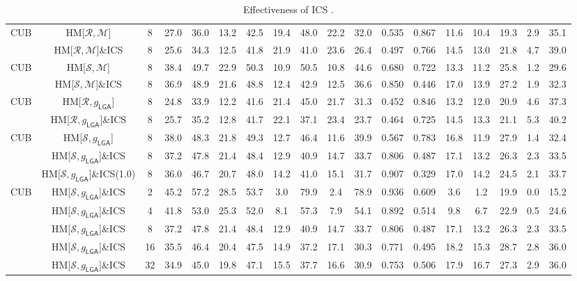 \begin{table*}
{\begin{tabular}{c|cc|cccc|ccccc|ccccc|c}
\multirow{2}{*}{CUB} & HM{[}$\mathcal{R},\mathcal{M}${]} & 8 & 27.0 & 36.0 & 13.2 & 42.5 & 19.4 & 48.0 & 22.2 & 32.0 & 0.535 & 0.867 & 11.6 & 10.4 & 19.3 & 2.9 & 35.1\tabularnewline
 & HM{[}$\mathcal{R},\mathcal{M}${]}\&ICS & 8 & 25.6 & 34.3 & 12.5 & 41.8 & 21.9 & 41.0 & 23.6 & 26.4 & 0.497 & 0.766 & 14.5 & 13.0 & 21.8 & 4.7 & 39.0\tabularnewline
\hline 
\multirow{2}{*}{CUB} & HM{[}$\mathcal{S},\mathcal{M}${]} & 8 & 38.4 & 49.7 & 22.9 & 50.3 & 10.9 & 50.5 & 10.8 & 44.6 & 0.680 & 0.722 & 13.3 & 11.2 & 25.8 & 1.2 & 29.6\tabularnewline
 & HM{[}$\mathcal{S},\mathcal{M}${]}\&ICS & 8 & 36.9 & 48.9 & 21.6 & 48.8 & 12.4 & 42.9 & 12.5 & 36.6 & 0.850 & 0.446 & 17.0 & 13.9 & 27.2 & 1.9 & 32.3\tabularnewline
\hline 
\multirow{2}{*}{CUB} & HM{[}$\mathcal{R},g_{\mathsf{LGA}}${]} & 8 & 24.8 & 33.9 & 12.2 & 41.6 & 21.4 & 45.0 & 21.7 & 31.3 & 0.452 & 0.846 & 13.2 & 12.0 & 20.9 & 4.6 & 37.3\tabularnewline
 & HM{[}$\mathcal{R},g_{\mathsf{LGA}}${]}\&ICS & 8 & 25.7 & 35.2 & 12.8 & 41.7 & 22.1 & 37.1 & 23.4 & 23.7 & 0.464 & 0.725 & 14.5 & 13.3 & 21.1 & 5.3 & 40.2\tabularnewline
\hline 
\multirow{3}{*}{CUB} & HM{[}$\mathcal{S},g_{\mathsf{LGA}}${]} & 8 & 38.0 & 48.3 & 21.8 & 49.3 & 12.7 & 46.4 & 11.6 & 39.9 & 0.567 & 0.783 & 16.8 & 11.9 & 27.9 & 1.4 & 32.4\tabularnewline
 & HM{[}$\mathcal{S},g_{\mathsf{LGA}}${]}\&ICS & 8 & 37.2 & 47.8 & 21.4 & 48.4 & 12.9 & 40.9 & 14.7 & 33.7 & 0.806 & 0.487 & 17.1 & 13.2 & 26.3 & 2.3 & 33.5\tabularnewline
 & HM{[}$\mathcal{S},g_{\mathsf{LGA}}${]}\&ICS(1.0) & 8 & 36.0 & 46.7 & 20.7 & 48.0 & 14.2 & 41.0 & 15.1 & 31.7 & 0.907 & 0.329 & 17.0 & 14.2 & 24.5 & 2.1 & 33.7\tabularnewline
\hline 
\multirow{5}{*}{CUB} & HM{[}$\mathcal{S},g_{\mathsf{LGA}}${]}\&ICS & 2 & 45.2 & 57.2 & 28.5 & 53.7 & 3.0 & 79.9 & 2.4 & 78.9 & 0.936 & 0.609 & 3.6 & 1.2 & 19.9 & 0.0 & 15.2\tabularnewline
 & HM{[}$\mathcal{S},g_{\mathsf{LGA}}${]}\&ICS & 4 & 41.8 & 53.0 & 25.3 & 52.0 & 8.1 & 57.3 & 7.9 & 54.1 & 0.892 & 0.514 & 9.8 & 6.7 & 22.9 & 0.5 & 24.6\tabularnewline
 & HM{[}$\mathcal{S},g_{\mathsf{LGA}}${]}\&ICS & 8 & 37.2 & 47.8 & 21.4 & 48.4 & 12.9 & 40.9 & 14.7 & 33.7 & 0.806 & 0.487 & 17.1 & 13.2 & 26.3 & 2.3 & 33.5\tabularnewline
 & HM{[}$\mathcal{S},g_{\mathsf{LGA}}${]}\&ICS & 16 & 35.5 & 46.4 & 20.4 & 47.5 & 14.9 & 37.2 & 17.1 & 30.3 & 0.771 & 0.495 & 18.2 & 15.3 & 28.7 & 2.8 & 36.0\tabularnewline
 & HM{[}$\mathcal{S},g_{\mathsf{LGA}}${]}\&ICS & 32 & 34.9 & 45.0 & 19.8 & 47.1 & 15.5 & 37.7 & 16.6 & 30.9 & 0.753 & 0.506 & 17.9 & 16.7 & 27.3 & 2.9 & 36.0\tabularnewline

	\bottomrule

\end{tabular}

	}
	\vspace{-0.5em}
\caption{Effectiveness of ICS .}
\label{tab:ics}
\end{table*}

